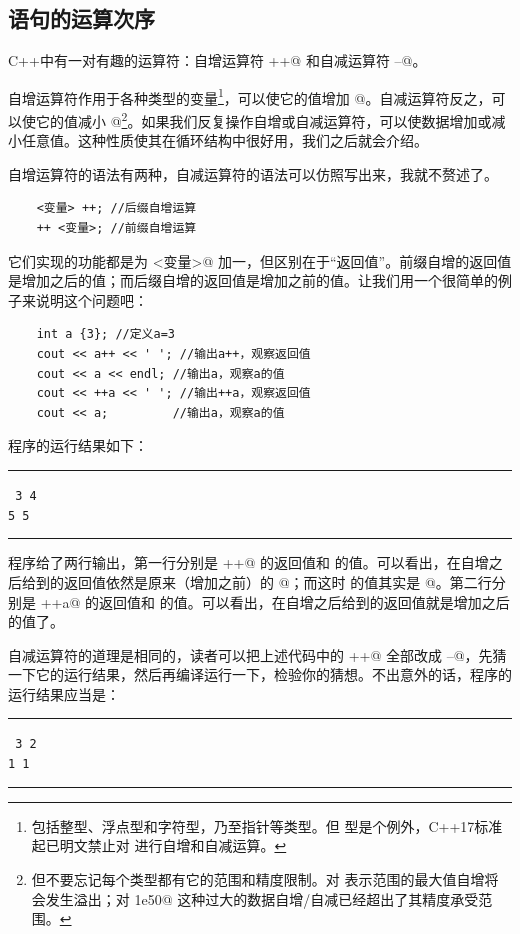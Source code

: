 \subsection*{语句的运算次序}
C++中有一对有趣的运算符：自增运算符 \lstinline@++@ 和自减运算符 \lstinline@--@。\par
自增运算符作用于各种类型的变量\footnote{包括整型、浮点型和字符型，乃至指针等类型。但 \lstinline@bool@ 型是个例外，C++17标准起已明文禁止对 \lstinline@bool@ 进行自增和自减运算。}，可以使它的值增加 @。自减运算符反之，可以使它的值减小 @\footnote{但不要忘记每个类型都有它的范围和精度限制。对 \lstinline@int@ 表示范围的最大值自增将会发生溢出；对 \lstinline@1e50@ 这种过大的数据自增/自减已经超出了其精度承受范围。}。如果我们反复操作自增或自减运算符，可以使数据增加或减小任意值。这种性质使其在循环结构中很好用，我们之后就会介绍。\par
自增运算符的语法有两种，自减运算符的语法可以仿照写出来，我就不赘述了。
\begin{lstlisting}
    <变量> ++; //后缀自增运算
    ++ <变量>; //前缀自增运算
\end{lstlisting}
它们实现的功能都是为 \lstinline@<变量>@ 加一，但区别在于``返回值''。前缀自增的返回值是增加之后的值；而后缀自增的返回值是增加之前的值。让我们用一个很简单的例子来说明这个问题吧：
\begin{lstlisting}
    int a {3}; //定义a=3
    cout << a++ << ' '; //输出a++，观察返回值
    cout << a << endl; //输出a，观察a的值
    cout << ++a << ' '; //输出++a，观察返回值
    cout << a;         //输出a，观察a的值
\end{lstlisting}
程序的运行结果如下：\\\noindent\rule{\linewidth}{0.2pt}\texttt{
3 4\\
5 5
}\\\noindent\rule{\linewidth}{0.2pt}\par
程序给了两行输出，第一行分别是 \lstinline@a++@ 的返回值和 \lstinline@a@ 的值。可以看出，\lstinline@a@ 在自增之后给到的返回值依然是原来（增加之前）的 @；而这时 \lstinline@a@ 的值其实是 @。第二行分别是 \lstinline@++a@ 的返回值和 \lstinline@a@ 的值。可以看出，\lstinline@a@ 在自增之后给到的返回值就是增加之后的值了。\par
自减运算符的道理是相同的，读者可以把上述代码中的 \lstinline@++@ 全部改成 \lstinline@--@，先猜一下它的运行结果，然后再编译运行一下，检验你的猜想。不出意外的话，程序的运行结果应当是：\pagebreak\\\noindent\rule{\linewidth}{0.2pt}\texttt{
3 2\\
1 1
}\\\noindent\rule{\linewidth}{0.2pt}\par
